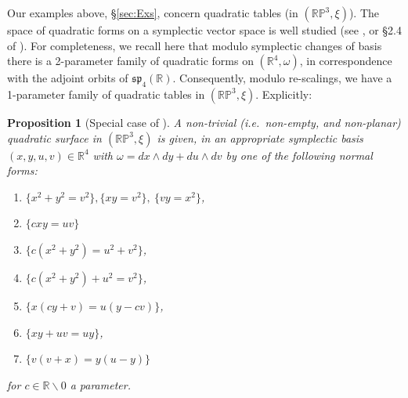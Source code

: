 \documentclass{article}
\newcommand{\R}{\mathbb{R}} %
\newtheorem{prop}{Proposition}[section]
\begin{document}
\begin{appendix}
Our examples above, \S \ref{sec:Exs}, concern quadratic tables (in $(\mathbb{RP}^3,\xi)$). The space of quadratic forms on a symplectic vector space is well studied (see \cite{WillNormForms}, or \S 2.4 of \cite{EDSIV}). For completeness, we recall here that modulo symplectic changes of basis there is a 2-parameter family of quadratic forms on $(\R^4,\omega)$, in correspondence with the adjoint orbits of $\mathfrak{sp}_4(\R)$. Consequently, modulo re-scalings, we have a 1-parameter family of quadratic tables in $(\mathbb{RP}^3,\xi)$. Explicitly:
\begin{prop}[Special case of \cite{WillNormForms}]\label{prop:QuadRP3}
 A non-trivial (i.e.~non-empty, and non-planar) quadratic surface in $(\mathbb{RP}^3,\xi)$ is given, in an appropriate symplectic basis $(x,y,u,v)\in \R^4$ with $\omega = dx\wedge dy + du\wedge dv$ by one of the following normal forms:
    \begin{enumerate}
        \item $\{ x^2 + y^2  = v^2\}, \{ xy = v^2\}, ~\{ vy = x^2\}$,
        \item $\{ cxy = uv\}$
        \item $\{ c(x^2 + y^2) = u^2 + v^2\}$,
        \item $\{ c(x^2 + y^2) + u^2 = v^2\}$,
        \item $\{ x(cy + v) = u(y-cv)\}$,
        \item $\{ xy + uv = uy \}$,
        \item $\{  v(v+x) = y(u-y) \}$
    \end{enumerate}
    for $c\in \R\backslash 0$ a parameter.

\end{prop}
\end{appendix}
\end{document}
